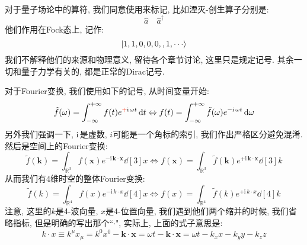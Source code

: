 对于量子场论中的算符, 我们同意使用$\hat{}$来标记, 比如湮灭-创生算子分别是:
\begin{equation}
  \hat{a} \quad \hat{a}^\dagger
\end{equation}
他们作用在Fock态上, 记作:
\begin{equation}
  \ket{1, 1, 0, 0, 0, ,1, \cdots}
\end{equation}
我们不解释他们的来源和物理意义, 留待各个章节讨论, 这里只是规定记号.
其余一切和量子力学有关的, 都是正常的Dirac记号.

对于Fourier变换, 我们使用如下的记号, 从时间变量开始:
\begin{equation}
  \tilde{f}(\omega) = \int_{-\infty}^{+\infty} f(t) e^{\fr{+}\mathrm{i}\, \omega t} \dd{t} \Leftrightarrow
  f(t) = \int_{-\infty}^{+\infty} \tilde{f}(\omega) e^{-\mathrm{i}\, \omega t} \dd{\omega}
\end{equation}
另外我们强调一下, $\mathrm{i}\,$是虚数, $i$可能是一个角标的索引, 我们作出严格区分避免混淆.
然后是空间上的Fourier变换:
\begin{equation}
  \tilde{f}(\bm{k}) = \int_{\mathbb{R}^3} f(\bm{x}) e^{-\mathrm{i}\, \bm{k} \cdot \bm{x}} \dd[3]{x} \Leftrightarrow
  f(\bm{x}) = \int_{\mathbb{R}^3} \tilde{f}(\bm{k}) e^{+\mathrm{i}\, \bm{k} \cdot \bm{x}} \dd[3]{k}
\end{equation}
从而我们有4维时空的整体Fourier变换:
\begin{equation}
  \tilde{f}(k) = \int_{\mathbb{R}^4} f(x) e^{-\mathrm{i}\, k \cdot x} \dd[4]{x} \Leftrightarrow
  f(x) = \int_{\mathbb{R}^4} \tilde{f}(k) e^{+\mathrm{i}\, k \cdot x} \dd[4]{k}
\end{equation}
注意, 这里的$k$是4-波向量, $x$是4-位置向量, 我们遇到他们两个缩并的时候, 我们省略指标, 但是明确的写出那个``$\cdot$", 实际上, 上面的式子意思是:
\begin{equation}
 k\cdot x \equiv k^\mu x_\mu = k^0 x^0 - \bm{k} \cdot \bm{x} = \omega t - \bm{k} \cdot \bm{x} = \omega t - k_x x - k_y y - k_z z
\end{equation}


